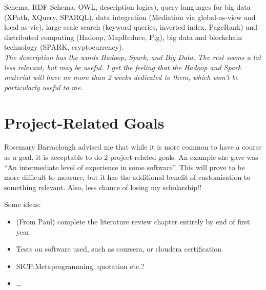 \documentclass[10pt,a4paper]{article}
\begin{document}
\begin{description}
  Schema, RDF Schema, OWL, description logics), query languages for big
  data (XPath, XQuery, SPARQL), data integration (Mediation via
  global-as-view and local-as-vie), large-scale search (keyword queries,
  inverted index, PageRank) and distributed computing (Hadoop,
  MapReduce, Pig), big data and blockchain technology (SPARK,
  cryptocurrency).\\
  \textit{The description has the words Hadoop, Spark, and Big Data.
    The rest seems a lot less relevant, but may be useful. I get the
    feeling that the Hadoop and Spark material will have no more than
    2 weeks dedicated to them, which won't be particularly useful to
    me.}
\end{description}

\section{Project-Related Goals}
\label{sec:proj-relat-goals}

Rosemary Barraclough advised me that while it is more common to have a
course as a goal, it is acceptable to do 2 project-related goals. An
example she gave was ``An intermediate level of experience in some
software''. This will prove to be more difficult to measure, but it
has the additional benefit of customisation to something relevant.
Also, less chance of losing my scholarship!!

Some ideas:
\begin{itemize}
\item (From Paul) complete the literature review chapter entirely by
  end of first year
\item Tests on software used, such as coursera, or cloudera
  certification
\item SICP:\@ Metaprogramming, quotation etc.?
\item \dots{}
\end{itemize}
\end{document}
